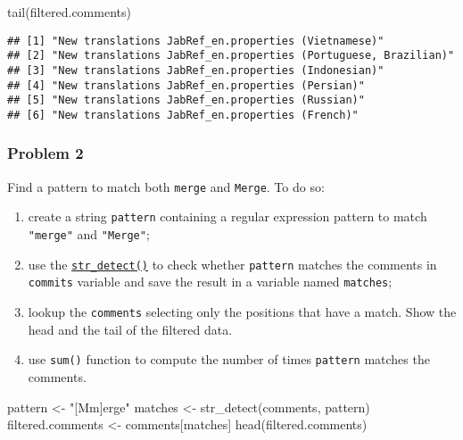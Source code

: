 \documentclass[
]{article}
\newenvironment{Shaded}{\begin{snugshade}}{\end{snugshade}}
\newcommand{\FunctionTok}[1]{\textcolor[rgb]{0.00,0.00,0.00}{#1}}
\newcommand{\NormalTok}[1]{#1}
\newcommand{\OtherTok}[1]{\textcolor[rgb]{0.56,0.35,0.01}{#1}}
\newcommand{\StringTok}[1]{\textcolor[rgb]{0.31,0.60,0.02}{#1}}
\providecommand{\tightlist}{%
  \setlength{\itemsep}{0pt}\setlength{\parskip}{0pt}}
\begin{document}
\begin{Shaded}
\begin{Highlighting}[]
\FunctionTok{tail}\NormalTok{(filtered.comments)}
\end{Highlighting}
\end{Shaded}

\begin{verbatim}
## [1] "New translations JabRef_en.properties (Vietnamese)"           
## [2] "New translations JabRef_en.properties (Portuguese, Brazilian)"
## [3] "New translations JabRef_en.properties (Indonesian)"           
## [4] "New translations JabRef_en.properties (Persian)"              
## [5] "New translations JabRef_en.properties (Russian)"              
## [6] "New translations JabRef_en.properties (French)"
\end{verbatim}

\hypertarget{problem-2}{%
\subsubsection{Problem 2}\label{problem-2}}

Find a pattern to match both \texttt{merge} and \texttt{Merge}. To do
so:

\begin{enumerate}
\def\labelenumi{\arabic{enumi}.}
\tightlist
\item
  create a string \texttt{pattern} containing a regular expression
  pattern to match \texttt{"merge"} and \texttt{"Merge"};
\item
  use the
  \href{https://stringr.tidyverse.org/reference/str_detect.html}{\texttt{str\_detect()}}
  to check whether \texttt{pattern} matches the comments in
  \texttt{commits} variable and save the result in a variable named
  \texttt{matches};
\item
  lookup the \texttt{comments} selecting only the positions that have a
  match. Show the head and the tail of the filtered data.
\item
  use \texttt{sum()} function to compute the number of times
  \texttt{pattern} matches the comments.
\end{enumerate}

\begin{Shaded}
\begin{Highlighting}[]
\NormalTok{pattern }\OtherTok{\textless{}{-}} \StringTok{"[Mm]erge"}
\NormalTok{matches }\OtherTok{\textless{}{-}} \FunctionTok{str\_detect}\NormalTok{(comments, pattern)}
\NormalTok{filtered.comments }\OtherTok{\textless{}{-}}\NormalTok{ comments[matches]}
\FunctionTok{head}\NormalTok{(filtered.comments)}
\end{Highlighting}
\end{Shaded}
\end{document}
